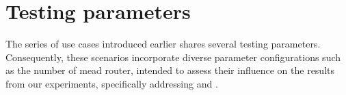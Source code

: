 
%         

\section{Testing parameters} %
\label{sec:Testing parameters}
The series of use cases introduced earlier shares several testing parameters.
Consequently, these scenarios incorporate diverse parameter configurations
    such as the number of \gls{mead} router, intended to assess their influence on the results from our experiments, specifically addressing \textit{\rqii{}} and \textit{\rqiv{}}.

